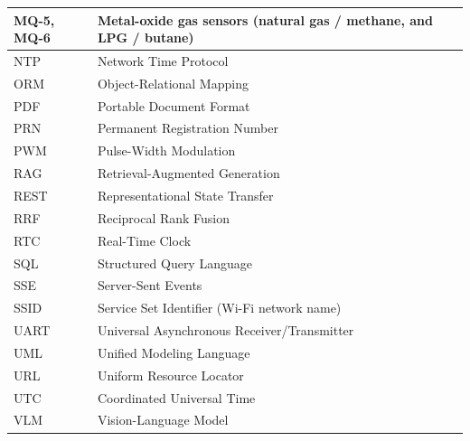 \begin{singlespace}
\begin{longtable}{|P{3.2cm}|P{10.2cm}|}
MQ-5, MQ-6 & Metal-oxide gas sensors (natural gas / methane, and LPG / butane)\\\hline
NTP & Network Time Protocol\\\hline
ORM & Object-Relational Mapping\\\hline
PDF & Portable Document Format\\\hline
PRN & Permanent Registration Number\\\hline
PWM & Pulse-Width Modulation\\\hline
RAG & Retrieval-Augmented Generation\\\hline
REST & Representational State Transfer\\\hline
RRF & Reciprocal Rank Fusion\\\hline
RTC & Real-Time Clock\\\hline
SQL & Structured Query Language\\\hline
SSE & Server-Sent Events\\\hline
SSID & Service Set Identifier (Wi-Fi network name)\\\hline
UART & Universal Asynchronous Receiver/Transmitter\\\hline
UML & Unified Modeling Language\\\hline
URL & Uniform Resource Locator\\\hline
UTC & Coordinated Universal Time\\\hline
VLM & Vision-Language Model\\\hline
\end{longtable}
\end{singlespace}
